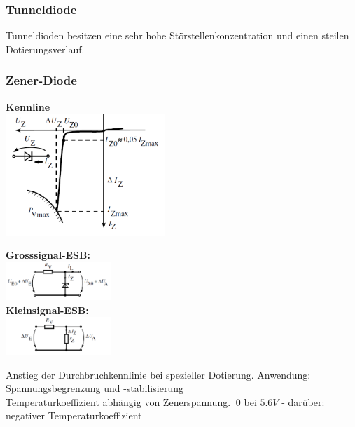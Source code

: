 		\subsubsection{Tunneldiode}
			Tunneldioden besitzen eine sehr hohe Störstellenkonzentration und einen
			steilen Dotierungsverlauf. 
			
		\subsubsection{Zener-Diode}
			\begin{minipage}{6.5cm}
				\textbf{Kennline} \\
				\includegraphics[width=6cm]{./images/zdiode-kennlinie.png}
			\end{minipage}
			\begin{minipage}{4.5cm}
				\textbf{Grosssignal-ESB:} \\
				\includegraphics[width=4cm]{./images/zener-gs} \\
				\textbf{Kleinsignal-ESB:} \\
				\includegraphics[width=4cm]{./images/zener-ks}
			\end{minipage}
			\begin{minipage}{7.5cm}
				Anstieg der Durchbruchkennlinie bei spezieller Dotierung. Anwendung: Spannungsbegrenzung und -stabilisierung  \\
				
				Temperaturkoeffizient abhängig von Zenerspannung. $~0$ bei $5.6V$ -
				darüber: negativer Temperaturkoeffizient\\
			\end{minipage} \\
			

